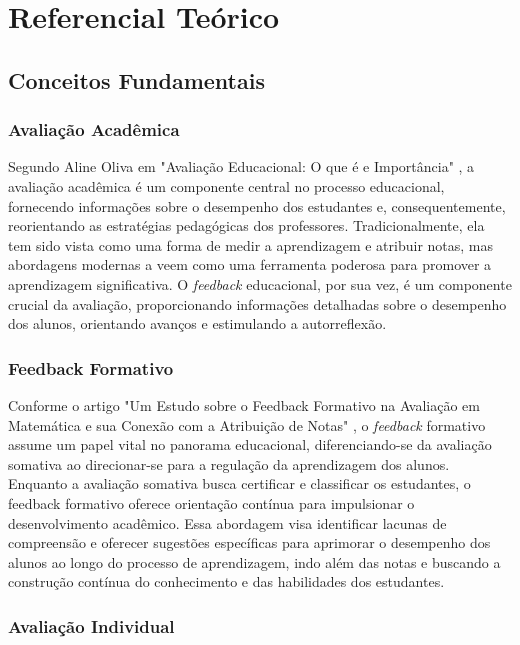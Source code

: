 \chapter{Referencial Teórico}

\section{Conceitos Fundamentais}

\subsection{Avaliação Acadêmica}

Segundo Aline Oliva em "Avaliação Educacional: O que é e Importância" \cite{oliva2023}, a avaliação acadêmica é um componente central no processo educacional, fornecendo informações sobre o desempenho dos estudantes e, consequentemente, reorientando as estratégias pedagógicas dos professores. Tradicionalmente, ela tem sido vista como uma forma de medir a aprendizagem e atribuir notas, mas abordagens modernas a veem como uma ferramenta poderosa para promover a aprendizagem significativa. O \textit{feedback} educacional, por sua vez, é um componente crucial da avaliação, proporcionando informações detalhadas sobre o desempenho dos alunos, orientando avanços e estimulando a autorreflexão. 

\subsection{Feedback Formativo}

Conforme o artigo "Um Estudo sobre o Feedback Formativo na Avaliação em Matemática e sua Conexão com a Atribuição de Notas" \cite{vaz2021}, o \textit{feedback} formativo assume um papel vital no panorama educacional, diferenciando-se da avaliação somativa ao direcionar-se para a regulação da aprendizagem dos alunos. Enquanto a avaliação somativa busca certificar e classificar os estudantes, o feedback formativo oferece orientação contínua para impulsionar o desenvolvimento acadêmico. Essa abordagem visa identificar lacunas de compreensão e oferecer sugestões específicas para aprimorar o desempenho dos alunos ao longo do processo de aprendizagem, indo além das notas e buscando a construção contínua do conhecimento e das habilidades dos estudantes.

\subsection{Avaliação Individual}


